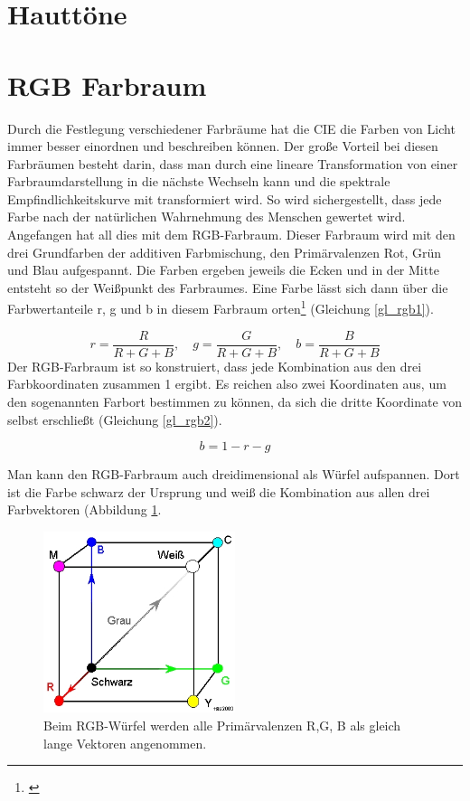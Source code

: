 
\section{Hauttöne}
 
\section{RGB Farbraum} \label{sec_rgb}
Durch die Festlegung verschiedener Farbräume hat die CIE die Farben von Licht immer besser einordnen und beschreiben können. Der große Vorteil bei diesen Farbräumen besteht darin, dass man durch eine lineare Transformation von einer Farbraumdarstellung in die nächste Wechseln kann und die spektrale Empfindlichkeitskurve mit transformiert wird. So wird sichergestellt, dass jede Farbe nach der natürlichen Wahrnehmung des Menschen gewertet wird.
Angefangen hat all dies mit dem RGB-Farbraum. Dieser Farbraum wird mit den drei Grundfarben der additiven Farbmischung, den Primärvalenzen Rot, Grün und Blau aufgespannt. Die Farben ergeben jeweils die Ecken und in der Mitte entsteht so der Weißpunkt des Farbraumes. Eine Farbe lässt sich dann über die Farbwertanteile r, g und b in diesem Farbraum orten\footnote{\cite[106]{hentschel}} (Gleichung \ref{gl_rgb1}).

\begin{equation}\label{gl_rgb1}
		r = \frac{R}{R+G+B},\quad g = \frac{G}{R+G+B},\quad b = \frac{B}{R+G+B}
\end{equation}
Der RGB-Farbraum ist so konstruiert, dass jede Kombination aus den drei Farbkoordinaten zusammen 1 ergibt. Es reichen also zwei Koordinaten aus, um den sogenannten Farbort bestimmen zu können, da sich die dritte Koordinate von selbst erschließt (Gleichung \ref{gl_rgb2}). 

\begin{equation}\label{gl_rgb2}
		b=1-r-g
\end{equation}

Man kann den RGB-Farbraum auch dreidimensional als Würfel aufspannen. Dort ist die Farbe schwarz der Ursprung und weiß die Kombination aus allen drei Farbvektoren (Abbildung \ref{b_rgb1}.

\begin{figure}[H]     %
\centering
\includegraphics[width=0.5\textwidth]{bilder/rgb1} 
\caption {Beim RGB-Würfel werden alle Primärvalenzen R,G, B als gleich lange Vektoren angenommen.\protect\footnotemark}\label{b_rgb1}
\end{figure}

